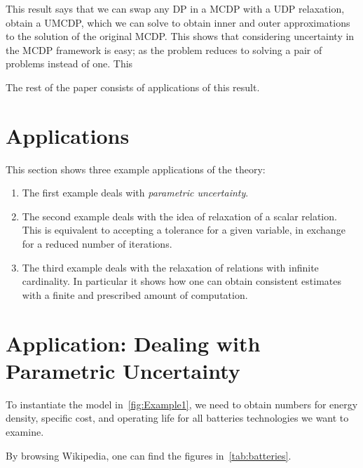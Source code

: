 This result says that we can swap any DP in a MCDP with a UDP relaxation,
obtain a UMCDP, which we can solve to obtain inner and outer approximations
to the solution of the original MCDP. This shows that considering
uncertainty in the MCDP framework is easy; as the problem reduces
to solving a pair of problems instead of one. This

The rest of the paper consists of applications of this result.

\section{Applications\label{sec:Applications}}

This section shows three example applications of the theory:
\begin{enumerate}
  \item The first example deals with \emph{parametric uncertainty}.
  \item The second example deals with the idea of relaxation of a scalar relation.
  This is equivalent to accepting a tolerance for a given variable,
  in exchange for a reduced number of iterations.
  \item The third example deals with the relaxation of relations with infinite
  cardinality. In particular it shows how one can obtain consistent
  estimates with a finite and prescribed amount of computation.
\end{enumerate}

\section{Application: Dealing with Parametric Uncertainty\label{sec:Application-uncertainty}}

To instantiate the model in~\cref{fig:Example1}, we need to
obtain numbers for energy density, specific cost, and operating life
for all batteries technologies we want to examine.

By browsing Wikipedia, one can find the figures in~\cref{tab:batteries}.

